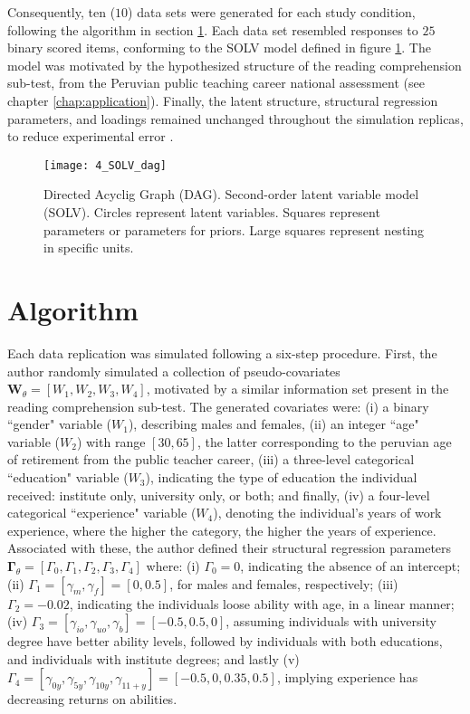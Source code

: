 Consequently, ten ($10$) data sets were generated for each study condition, following the algorithm in section \ref{sect:algorithm}. Each data set resembled responses to $25$ binary scored items, conforming to the SOLV model defined in figure \ref{fig:SOLV_model}. The model was motivated by the hypothesized structure of the reading comprehension sub-test, from the Peruvian public teaching career national assessment (see chapter \ref{chap:application}). Finally, the latent structure, structural regression parameters, and loadings remained unchanged throughout the simulation replicas, to reduce experimental error \cite{Kieftenbeld_et_al_2012}. 
%
\begin{figure}[h]
	\centering
	\texttt{[image: 4\_SOLV\_dag]}
	\caption[Directed Acyclic Graph (DAG). Second-order latent variable model (SOLV).]%
	{Directed Acyclig Graph (DAG). Second-order latent variable model (SOLV). Circles represent latent variables. Squares represent parameters or parameters for priors. Large squares represent nesting in specific units.}
	\label{fig:SOLV_model}
\end{figure}


\section{Algorithm} \label{sect:algorithm}

Each data replication was simulated following a six-step procedure. First, the author randomly simulated a collection of pseudo-covariates $\mathbf{W}_{\theta} = [ W_{1}, W_{2}, W_{3}, W_{4} ]$, motivated by a similar information set present in the reading comprehension sub-test. The generated covariates were: (i) a binary ``gender" variable ($W_{1}$), describing males and females, (ii) an integer ``age" variable ($W_{2}$) with range $[30, 65]$, the latter corresponding to the peruvian age of retirement from the public teacher career, (iii) a three-level categorical ``education" variable ($W_{3}$), indicating the type of education the individual received: institute only, university only, or both; and finally, (iv) a four-level categorical ``experience" variable ($W_{4}$), denoting the individual's years of work experience, where the higher the category, the higher the years of experience. Associated with these, the author defined their structural regression parameters $\mathbf{\Gamma}_{\theta} = [\Gamma_{0}, \Gamma_{1}, \Gamma_{2}, \Gamma_{3}, \Gamma_{4}]$ where: (i) $\Gamma_{0} = 0$, indicating the absence of an intercept; (ii) $\Gamma_{1} = [\gamma_{m}, \gamma_{f}] = [0, 0.5]$, for males and females, respectively; (iii) $\Gamma_{2} = -0.02$, indicating the individuals loose ability with age, in a linear manner; (iv) $\Gamma_{3} = [\gamma_{io}, \gamma_{uo}, \gamma_{b}] = [-0.5, 0.5, 0]$, assuming individuals with university degree have better ability levels, followed by individuals with both educations, and individuals with institute degrees; and lastly (v) $\Gamma_{4} = [\gamma_{0y}, \gamma_{5y}, \gamma_{10y}, \gamma_{11+y}] = [-0.5, 0, 0.35, 0.5]$, implying experience has decreasing returns on abilities.

